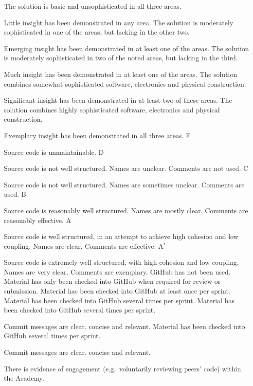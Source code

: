 \documentclass{../fal_assignment}
\begin{document}
\begin{markingrubric}
        \grade The solution is basic and unsophisticated in all three areas.
            \par Little insight has been demonstrated in any area.
        \grade The solution is moderately sophisticated in one of the areas, but lacking in the other two.
            \par Emerging insight has been demonstrated in at least one of the areas.
        \grade The solution is moderately sophisticated in two of the noted areas, but lacking in the third.
            \par Much insight has been demonstrated in at least one of the areas.
        \grade The solution combines somewhat sophisticated software, electronics and physical construction.
            \par Significant insight has been demonstrated in at least two of these areas.
        \grade The solution combines highly sophisticated software, electronics and physical construction.
            \par Exemplary insight has been demonstrated in all three areas.
        \grade\fail F
            \par Source code is unmaintainable.
        \grade D
            \par Source code is not well structured.
                Names are unclear. Comments are not used.
        \grade C
            \par Source code is not well structured.
                Names are sometimes unclear. Comments are used.
        \grade B
            \par Source code is reasonably well structured.
                Names are mostly clear. Comments are reasonably effective.
        \grade A
            \par Source code is well structured, in an attempt to achieve high cohesion and low coupling.
                Names are clear. Comments are effective.
        \grade A$^*$
            \par Source code is extremely well structured, with high cohesion and low coupling.
                Names are very clear. Comments are exemplary.
        \grade\fail GitHub has not been used.
        \grade Material has only been checked into GitHub when required for review or submission.
        \grade Material has been checked into GitHub at least once per sprint.
        \grade Material has been checked into GitHub several times per sprint.
        \grade Material has been checked into GitHub several times per sprint.
            \par Commit messages are clear, concise and relevant.
        \grade Material has been checked into GitHub several times per sprint.
            \par Commit messages are clear, concise and relevant.
            \par There is evidence of engagement (e.g.\ voluntarily reviewing peers' code)
                within the Academy.
\end{markingrubric}
\end{document}

